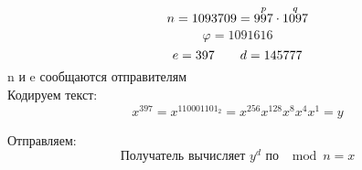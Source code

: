 \documentclass[discrete.tex]{subfiles}
\begin{document}
  \begin{Example}
    \[n=1093709 = \overset{p}{997} \cdot \overset{q}{1097}\]
    \[\varphi = 1091616\]
    \[e = 397 \qquad d = 145777\]
    n и e сообщаются отправителям\\

    Кодируем текст:
    \[x^397 = x^{110001101_2} = x^{256} x^{128} x^{8} x^{4} x^1 = y\]

    Отправляем:
    \[\text{Получатель вычисляет $y^d$ по $\mod n = x$}\]
  \end{Example}
\end{document}
